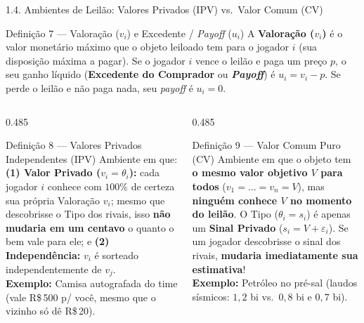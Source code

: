 \documentclass[aspectratio=169, 10pt]{beamer}
\newcommand{\defbox}[2]{%
  \begin{block}{#1}
    \footnotesize\setlength{\abovedisplayskip}{4pt}\setlength{\belowdisplayskip}{4pt}
    #2\par
  \end{block}%
}
\newcommand{\teobox}[2]{%
  \begin{alertblock}{#1}
    \footnotesize\setlength{\abovedisplayskip}{4pt}\setlength{\belowdisplayskip}{4pt}
    #2\par
  \end{alertblock}%
}
\begin{document}
\begin{frame}{1.4. Ambientes de Leilão: Valores Privados (IPV)
  vs.\ Valor Comum (CV)}
  \defbox{Definição 7 --- Valoração ($v_i$) e Excedente /
  \textit{Payoff} ($u_i$)}{%
    A \textbf{Valoração ($v_i$)} é o valor monetário máximo que o
    objeto leiloado tem para o jogador $i$ (sua disposição máxima a
    pagar). Se o jogador $i$ vence o leilão e paga um preço $p$, o
    seu ganho líquido (\textbf{Excedente do Comprador} ou
    \textbf{\textit{Payoff}}) é $u_i = v_i - p$. Se perde o leilão e
    não paga nada, seu \textit{payoff} é $u_i = 0$.
  }
  \vspace{-0.1cm}
  \begin{columns}[T, onlytextwidth]
    \begin{column}{0.485\textwidth}
      \defbox{Definição 8 --- Valores Privados Independentes (IPV)}{%
        Ambiente em que: \textbf{(1) Valor Privado ($v_i =
        \theta_i$):} cada jogador $i$ conhece com $100\%$ de certeza
        sua própria Valoração $v_i$; mesmo que descobrisse o Tipo dos
        rivais, isso \textbf{não mudaria em um centavo} o quanto o
        bem vale para ele; e \textbf{(2) Independência:} $v_i$ é
        sorteado independentemente de $v_j$.\\[3pt]
        \textbf{Exemplo:} Camisa autografada do time (vale R\$\,500
        p/ você, mesmo que o vizinho só dê R\$\,20).
      }
    \end{column}
    \begin{column}{0.485\textwidth}
      \teobox{Definição 9 --- Valor Comum Puro (CV)}{%
        Ambiente em que o objeto tem \textbf{o mesmo valor objetivo
        $V$ para todos} ($v_1 = \dots = v_n = V$), mas
        \textbf{ninguém conhece $V$ no momento do leilão}. O Tipo
        ($\theta_i = s_i$) é apenas um \textbf{Sinal Privado} ($s_i =
        V + \varepsilon_i$). Se um jogador descobrisse o sinal dos
        rivais, \textbf{mudaria imediatamente sua estimativa}!\\[3pt]
        \textbf{Exemplo:} Petróleo no pré-sal (laudos sísmicos:
        $1{,}2$ bi vs.\ $0{,}8$ bi e $0{,}7$ bi).
      }
    \end{column}
  \end{columns}
\end{frame}
\end{document}
